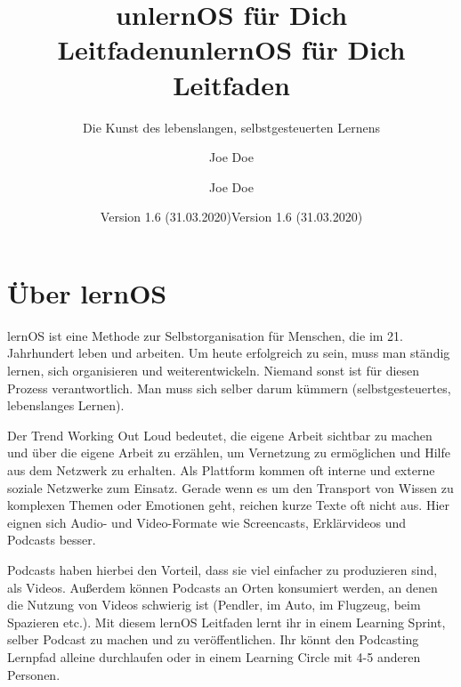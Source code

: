 \documentclass[
  ngerman,
  paper=a4,
,captions=tableheading
]{scrartcl}
\title{unlernOS für Dich Leitfaden}
\subtitle{Die Kunst des lebenslangen, selbstgesteuerten Lernens}
\author{Joe Doe}
\date{Version 1.6 (31.03.2020)}
\title{unlernOS für Dich Leitfaden}
\author{Joe Doe}
\date{Version 1.6 (31.03.2020)}
\begin{document}
\begin{titlepage}
\afterpage{\restorepagecolor}
\newcommand{\colorRule}[3][black]{\textcolor[HTML]{#1}{\rule{#2}{#3}}}
\end{titlepage}
\restoregeometry




{
\setcounter{tocdepth}{3}
\tableofcontents
\newpage
}
\hypertarget{uxfcber-lernos}{%
\section{Über lernOS}\label{uxfcber-lernos}}

lernOS ist eine Methode zur Selbstorganisation für Menschen, die im 21.
Jahrhundert leben und arbeiten. Um heute erfolgreich zu sein, muss man
ständig lernen, sich organisieren und weiterentwickeln. Niemand sonst
ist für diesen Prozess verantwortlich. Man muss sich selber darum
kümmern (selbstgesteuertes, lebenslanges Lernen).

Der Trend Working Out Loud bedeutet, die eigene Arbeit sichtbar zu
machen und über die eigene Arbeit zu erzählen, um Vernetzung zu
ermöglichen und Hilfe aus dem Netzwerk zu erhalten. Als Plattform kommen
oft interne und externe soziale Netzwerke zum Einsatz. Gerade wenn es um
den Transport von Wissen zu komplexen Themen oder Emotionen geht,
reichen kurze Texte oft nicht aus. Hier eignen sich Audio- und
Video-Formate wie Screencasts, Erklärvideos und Podcasts besser.

Podcasts haben hierbei den Vorteil, dass sie viel einfacher zu
produzieren sind, als Videos. Außerdem können Podcasts an Orten
konsumiert werden, an denen die Nutzung von Videos schwierig ist
(Pendler, im Auto, im Flugzeug, beim Spazieren etc.). Mit diesem lernOS
Leitfaden lernt ihr in einem Learning Sprint, selber Podcast zu machen
und zu veröffentlichen. Ihr könnt den Podcasting Lernpfad alleine
durchlaufen oder in einem Learning Circle mit 4-5 anderen Personen.
\end{document}
